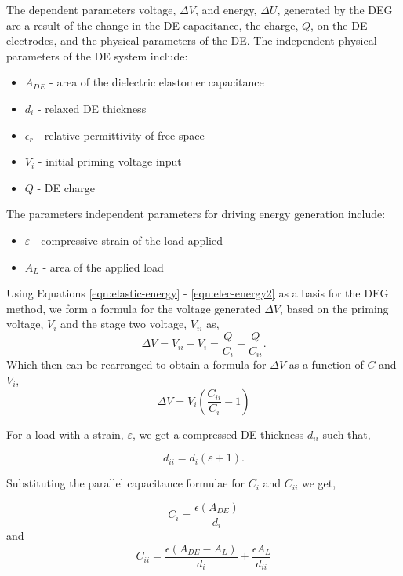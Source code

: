 The dependent parameters voltage, $\Delta V$, and energy, $\Delta U$, generated by the DEG are a result of the change in the DE capacitance, the charge, $Q$, on the DE electrodes, and the physical parameters of the DE. The independent physical parameters of the DE system include:
\begin{itemize}
	\item $A_{DE}$ - area of the dielectric elastomer capacitance
	\item $d_i$ - relaxed DE thickness
	\item $\epsilon_r$ - relative permittivity of free space
	\item $V_i$ - initial priming voltage input
	\item $Q$ - DE charge
\end{itemize}
The parameters independent parameters for driving energy generation include:
\begin{itemize}
	\item $\varepsilon$ - compressive strain of the load applied
	\item $A_L$ - area of the applied load
\end{itemize}

Using Equations \ref{eqn:elastic-energy} - \ref{eqn:elec-energy2} as a basis for the DEG method, we form a formula for the voltage generated $\Delta V$, based on the priming voltage, $V_i$ and the stage two voltage, $V_{ii}$ as,
\begin{equation}
	\Delta V = V_{ii} - V_i = \frac{Q}{C_{i}} - \frac{Q}{C_{ii}}.
	\label{eqn:F1}
\end{equation}
Which then can be rearranged to obtain a formula for $\Delta V$ as a function of $C$ and $V_i$,
\begin{equation}
	\Delta V = V_i \left(\frac{C_{ii}}{C_i} - 1\right)
	\label{eqn:F2}
\end{equation}

For a load with a strain, $\varepsilon$, we get a compressed DE thickness $d_{ii}$ such that,

\begin{equation}
	d_{ii} = d_i(\varepsilon + 1).
	\label{eqn:F3}
\end{equation}

Substituting the parallel capacitance formulae for $C_i$ and $C_{ii}$ we get,

\begin{equation}
	C_i = \frac{\epsilon (A_{DE})}{d_i}
	\label{eqn:F4}
\end{equation}
and
\begin{equation}
	C_{ii} = \frac{\epsilon (A_{DE} - A_L)}{d_i} + \frac{\epsilon A_L}{d_{ii}}
	\label{eqn:F5}
\end{equation}

